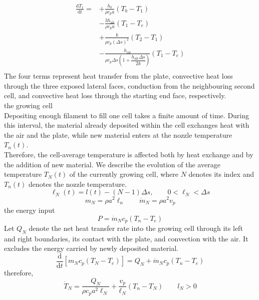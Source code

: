 \documentclass{article}
\begin{document}
\begin{equation}
    \begin{aligned}
        \frac{\mathrm{d}T_1}{\mathrm{d}t}
        =
        &+\frac{h_b}{\rho c_p a}(T_b-T_1)\\
        &-\frac{3h_{\mathrm{air}}}{\rho c_p a}(T_1-T_e)\\
        &+\frac{k}{\rho c_p(\Delta s)^2}(T_2-T_1)\\
        &-\frac{h_{\mathrm{air}}}
        {\rho c_p\Delta s
        \left(1+\dfrac{h_{\mathrm{air}}\Delta s}{2k}\right)}
        (T_1-T_e)\\
    \end{aligned}
    \label{eq:firstcell}
\end{equation}
The four terms represent heat transfer from the plate, convective heat loss through the three exposed lateral faces, conduction from the neighbouring second cell, and convective heat loss through the starting end face, respectively.
\\the growing cell
\\Depositing enough filament to fill one cell takes a finite amount of time. During this interval, the material already deposited within the cell exchanges heat with the air and the plate, while new material enters at the nozzle temperature $T_n(t)$.
\\Therefore, the cell-average temperature is affected both by heat exchange and by the addition of new material. We describe the evolution of the average temperature $T_N(t)$ of the currently growing cell, where $N$ denotes its index and $T_n(t)$ denotes the nozzle temperature.
\begin{equation}
    \ell_N(t)=l(t)-(N-1)\Delta s,
    \qquad
    0<\ell_N<\Delta s
\end{equation}
\begin{equation}
    m_N=\rho a^2 \ell_n
    \qquad
    \dot{m}_N=\rho a^2 v_p
\end{equation}
the energy input 
\begin{equation}
    P=\dot{m}_Nc_p(T_n-T_e)
\end{equation}
Let $Q_N$ denote the net heat transfer rate into the growing cell through its left and right boundaries, its contact with the plate, and convection with the air.
 It excludes the energy carried by newly deposited material.
\begin{equation}
    \frac{\mathrm{d}}{\mathrm{d}t}[m_Nc_p(T_N-T_e)]=Q_N+\dot{m}_Nc_p(T_n-T_e)
\end{equation}
therefore,
\begin{equation}
    \dot{T}_N=
    \frac{Q_N}{\rho c_p a^2 \ell_N}
    +\frac{v_p}{\ell_N}(T_n-T_N)
    \qquad
    l_N>0
\end{equation}
\end{document}
